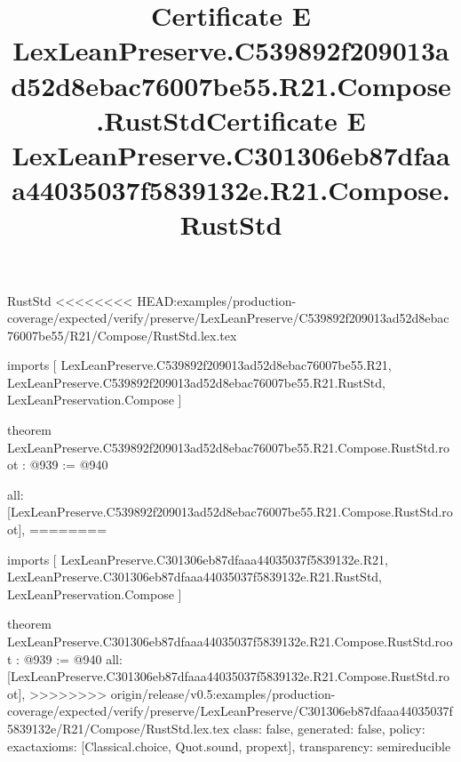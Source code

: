 \begin{lexlean}{RustStd}
<<<<<<<< HEAD:examples/production-coverage/expected/verify/preserve/LexLeanPreserve/C539892f209013ad52d8ebac76007be55/R21/Compose/RustStd.lex.tex
\title{Certificate E LexLeanPreserve.C539892f209013ad52d8ebac76007be55.R21.Compose.RustStd}
\begin{coremodule}
imports [
  LexLeanPreserve.C539892f209013ad52d8ebac76007be55.R21,
  LexLeanPreserve.C539892f209013ad52d8ebac76007be55.R21.RustStd,
  LexLeanPreservation.Compose
]

theorem LexLeanPreserve.C539892f209013ad52d8ebac76007be55.R21.Compose.RustStd.root : @939 := @940 {
  all: [LexLeanPreserve.C539892f209013ad52d8ebac76007be55.R21.Compose.RustStd.root],
========
\title{Certificate E LexLeanPreserve.C301306eb87dfaaa44035037f5839132e.R21.Compose.RustStd}
\begin{coremodule}
imports [
  LexLeanPreserve.C301306eb87dfaaa44035037f5839132e.R21,
  LexLeanPreserve.C301306eb87dfaaa44035037f5839132e.R21.RustStd,
  LexLeanPreservation.Compose
]

theorem LexLeanPreserve.C301306eb87dfaaa44035037f5839132e.R21.Compose.RustStd.root : @939 := @940 {
  all: [LexLeanPreserve.C301306eb87dfaaa44035037f5839132e.R21.Compose.RustStd.root],
>>>>>>>> origin/release/v0.5:examples/production-coverage/expected/verify/preserve/LexLeanPreserve/C301306eb87dfaaa44035037f5839132e/R21/Compose/RustStd.lex.tex
  class: false,
  generated: false,
  policy: exact{axioms: [Classical.choice, Quot.sound, propext]},
  transparency: semireducible
}


\end{coremodule}}
\end{coremodule}
\end{lexlean}
